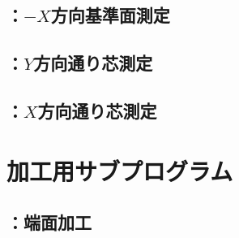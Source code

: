 \clearpage
\subsection{\MXface：$-X$方向基準面測定}



\clearpage
\subsection{\MYcenterline：$Y$方向通り芯測定}



\clearpage
\subsection{\MXcenterline：$X$方向通り芯測定}




\clearpage
\section{加工用サブプログラム}


\subsection{\KRecRight：端面加工}



\clearpage
